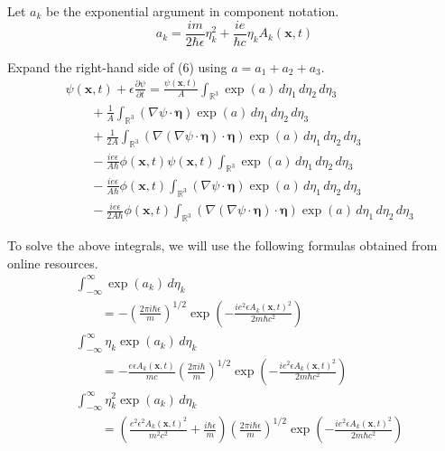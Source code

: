 \documentclass[12pt]{article}
\begin{document}
Let $a_k$ be the exponential argument in component notation.
\begin{equation*}
a_k=\frac{im}{2\hbar\epsilon}\eta_k^2+\frac{ie}{\hbar c}\eta_kA_k(\mathbf x,t)
\end{equation*}

Expand the right-hand side of (6) using $a=a_1+a_2+a_3$.
\begin{align*}
&\psi(\mathbf{x},t)+\epsilon\frac{\partial\psi}{\partial t}
=\frac{\psi(\mathbf x,t)}{A}\int_{\mathbb R^3}
\exp(a)\,d\eta_1\,d\eta_2\,d\eta_3
\tag{7}
\\
&\qquad{}+\frac{1}{A}\int_{\mathbb R^3}
(\nabla\psi\cdot\boldsymbol\eta)
\exp(a)\,d\eta_1\,d\eta_2\,d\eta_3
\tag{8}
\\
&\qquad{}+\frac{1}{2A}\int_{\mathbb R^3}
(\nabla(\nabla\psi\cdot\boldsymbol\eta)\cdot\boldsymbol\eta)
\exp(a)\,d\eta_1\,d\eta_2\,d\eta_3
\tag{9}
\\
&\qquad{}-\frac{ie\epsilon}{A\hbar}
\phi\left(\mathbf x,t\right)\psi(\mathbf x,t)\int_{\mathbb R^3}
\exp(a)\,d\eta_1\,d\eta_2\,d\eta_3
\tag{10}
\\
&\qquad{}-\frac{ie\epsilon}{A\hbar}
\phi\left(\mathbf x,t\right)\int_{\mathbb R^3}
(\nabla\psi\cdot\boldsymbol\eta)
\exp(a)\,d\eta_1\,d\eta_2\,d\eta_3
\tag{11}
\\
&\qquad{}-\frac{ie\epsilon}{2A\hbar}
\phi\left(\mathbf x,t\right)\int_{\mathbb R^3}
(\nabla(\nabla\psi\cdot\boldsymbol\eta)\cdot\boldsymbol\eta)
\exp(a)\,d\eta_1\,d\eta_2\,d\eta_3
\tag{12}
\end{align*}

To solve the above integrals, we will use the following formulas obtained from online resources.
\begin{align*}
&\int_{-\infty}^\infty\exp(a_k)\,d\eta_k
\\
&\qquad{}=-\left(\frac{2\pi i\hbar\epsilon}{m}\right)^{1/2}
\exp\left(-\frac{ie^2\epsilon A_k(\mathbf x,t)^2}{2m\hbar c^2}\right)
\tag{13}
\\
&\int_{-\infty}^\infty\eta_k\exp(a_k)\,d\eta_k
\\
&\qquad{}=-\frac{e\epsilon A_k(\mathbf x,t)}{mc}
\left(\frac{2\pi i\hbar}{m}\right)^{1/2}
\exp\left(-\frac{ie^2\epsilon A_k(\mathbf x,t)^2}{2m\hbar c^2}\right)
\tag{14}
\\
&\int_{-\infty}^\infty\eta_k^2\exp(a_k)\,d\eta_k
\\
&\qquad{}=\left(\frac{e^2\epsilon^2 A_k(\mathbf x,t)^2}{m^2c^2}+\frac{i\hbar\epsilon}{m}\right)
\left(\frac{2\pi i\hbar\epsilon}{m}\right)^{1/2}
\exp\left(-\frac{ie^2\epsilon A_k(\mathbf x,t)^2}{2m\hbar c^2}\right)
\tag{15}
\end{align*}
\end{document}
